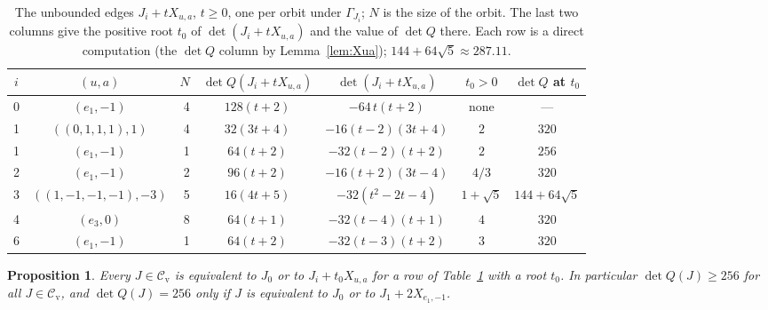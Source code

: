 \documentclass[11pt,reqno]{amsart}
\renewcommand{\_}{\origunderscore\allowbreak}
\numberwithin{equation}{section}
\theoremstyle{plain}
\newtheorem{prop}[thm]{Proposition}
\theoremstyle{definition}
\theoremstyle{remark}
\newcommand{\cand}{\mathcal{C}_{\mathrm{v}}}
\begin{document}
\begin{table}[t]
\centering
\small
\renewcommand{\arraystretch}{1.25}
\begin{tabular}{@{}c c r c c c c@{}}
\toprule
$i$ & $(u,a)$ & $N$ & $\det Q(J_i+tX_{u,a})$ & $\det(J_i+tX_{u,a})$ & $t_0>0$ & $\det Q$ at $t_0$\\
\midrule
0 & $(e_1,-1)$ & 4 & $128(t+2)$ & $-64\,t(t+2)$ & none & ---\\
1 & $((0,1,1,1),1)$ & 4 & $32(3t+4)$ & $-16(t-2)(3t+4)$ & $2$ & $320$\\
1 & $(e_1,-1)$ & 1 & $64(t+2)$ & $-32(t-2)(t+2)$ & $2$ & $256$\\
2 & $(e_1,-1)$ & 2 & $96(t+2)$ & $-16(t+2)(3t-4)$ & $4/3$ & $320$\\
3 & $((1,-1,-1,-1),-3)$ & 5 & $16(4t+5)$ & $-32(t^2-2t-4)$ & $1+\sqrt5$ & $144+64\sqrt5$\\
4 & $(e_3,0)$ & 8 & $64(t+1)$ & $-32(t-4)(t+1)$ & $4$ & $320$\\
6 & $(e_1,-1)$ & 1 & $64(t+2)$ & $-32(t-3)(t+2)$ & $3$ & $320$\\
\bottomrule
\end{tabular}
\caption{The unbounded edges $J_i+tX_{u,a}$, $t\ge0$, one per orbit under $\Gamma_{J_i}$; $N$ is the size of the orbit. The last two columns give the positive root $t_0$ of $\det(J_i+tX_{u,a})$ and the value of $\det Q$ there. Each row is a direct computation (the $\det Q$ column by Lemma~\ref{lem:Xua}); $144+64\sqrt5\approx287.11$.}
\label{tab:unbounded}
\end{table}

\begin{prop}\label{prop:candidates}
Every $J\in\cand$ is equivalent to $J_0$ or to $J_i+t_0X_{u,a}$ for a row of Table~\ref{tab:unbounded} with a root $t_0$. In particular $\det Q(J)\ge256$ for all $J\in\cand$, and $\det Q(J)=256$ only if $J$ is equivalent to $J_0$ or to $J_1+2X_{e_1,-1}$.
\end{prop}
\end{document}
